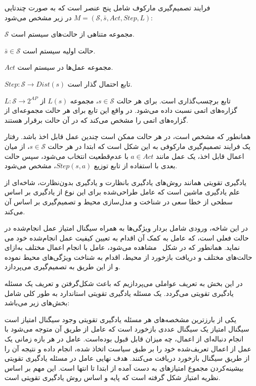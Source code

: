 فرایند تصمیم‌گیری مارکوف شامل پنج عنصر است که به صورت چندتایی $M = (\mathcal{S}, \bar{s}, Act, Step, L)$ در زیر مشخص می‌شود:




 $\mathcal{S}$ مجموعه متناهی از حالت‌های سیستم است.

 $\bar{s} \in \mathcal{S}$ حالت اولیه سیستم است. 

 $Act$ مجموعه عمل‌ها در سیستم است. 

 $Step: \mathcal{S} \rightarrow Dist(s)$ تابع احتمال گذار است. 

 $L : \mathcal{S} \rightarrow 2 ^{AP}$ تابع برچسب‌گذاری است. برای هر حالت $s \in \mathcal{S}$، مجموعه $L(s)$ از گزاره‌های اتمی نسبت داده می‌شود. در واقع این تابع برای هر حالت مجموعه‌ای از گزاره‌های اتمی را مشخص می‌کند که در آن حالت برقرار هستند. 



همانطور که مشخص است، در هر حالت ممکن است چندین عمل قابل اخذ باشد. رفتار یک فرایند تصمیم‌گیری مارکوفی به این شکل است که ابتدا در هر حالت $s \in \mathcal{S}$، از میان اعمال قابل اخذ، یک عمل مانند ${a \in Act}$ با عدم‌قطعیت انتخاب می‌شود، سپس حالت بعدی با استفاده از تابع توزیع $Step(s,a)$، مشخص می‌شود. 



یادگیری تقویتی همانند روش‌های یادگیری بانظارت و یادگیری بدون‌نظارت، شاخه‌ای از علم یادگیری ماشین است که عامل طراحی‌شده برای این نوع از یادگیری بر اساس سطحی از خطا سعی در شناخت و مدل‌سازی محیط و تصمیم‌گیری بر اساس آن می‌کند. 

در این شاخه، ورودی شامل بردار ویژگی‌ها به همراه سیگنال امتیاز عمل انجام‌شده در حالت فعلی است، که عامل به کمک آن اقدام به تعیین کیفیت عمل انجام‌شده خود می نماید. همانطور که در شکل~ مشاهده می‌شود، عامل با انجام اعمال مختلف به‌ازای حالت‌های مختلف و دریافت بازخورد از محیط، اقدام به شناخت ویژگی‌های محیط نموده و از این طریق به تصمیم‌گیری می‌پردازد. 




در این بخش به تعریف عواملی می‌پردازیم که باعث شکل‌گرفتن و تعریف یک مسئله یادگیری تقویتی می‌گردد. یک مسئله یادگیری تقویتی استاندارد به طور کلی شامل بخش‌های زیر می‌باشد:


یکی از بارزترین مشخصه‌های هر مسئله یادگیری تقویتی وجود سیگنال امتیاز است سیگنال امتیاز یک سیگنال عددی بازخورد است که عامل از طریق آن متوجه می‌شود با انجام دنباله‌ای از اعمال، چه میزان قابل قبول بوده‌است. عامل در هر بازه زمانی یک عمل از اعمال تعریف‌شده خود را بر طبق سیاست اتخاذ شده، انجام داده و نتیجه آن را از طریق سیگنال بازخورد دریافت می‌کنند. هدف نهایی عامل در مسئله یادگیری تقویتی بیشینه‌کردن مجموع امتیازهای به‌ دست آمده از ابتدا تا انتها است. این مهم بر اساس نظریه امتیاز شکل گرفته است که پایه و اساس روش یادگیری تقویتی است.

